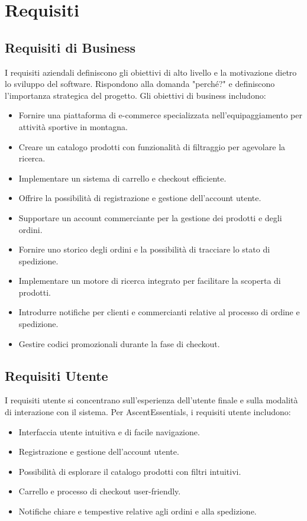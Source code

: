 
\chapter{Requisiti}

\section{Requisiti di Business}
I requisiti aziendali definiscono gli obiettivi di alto livello e la motivazione dietro lo sviluppo del software. Rispondono alla domanda "perché?" e definiscono l'importanza strategica del progetto.
Gli obiettivi di business includono:
\begin{itemize}
    \item Fornire una piattaforma di e-commerce specializzata nell'equipaggiamento per attività sportive in montagna.
    \item Creare un catalogo prodotti con funzionalità di filtraggio per agevolare la ricerca.
    \item Implementare un sistema di carrello e checkout efficiente.
    \item Offrire la possibilità di registrazione e gestione dell'account utente.
    \item Supportare un account commerciante per la gestione dei prodotti e degli ordini.
    \item Fornire uno storico degli ordini e la possibilità di tracciare lo stato di spedizione.
    \item Implementare un motore di ricerca integrato per facilitare la scoperta di prodotti.
    \item Introdurre notifiche per clienti e commercianti relative al processo di ordine e spedizione.
    \item Gestire codici promozionali durante la fase di checkout.
\end{itemize}

\section{Requisiti Utente}
I requisiti utente si concentrano sull'esperienza dell'utente finale e sulla modalità di interazione con il sistema. Per AscentEssentials, i requisiti utente includono:
\begin{itemize}
    \item Interfaccia utente intuitiva e di facile navigazione.
    \item Registrazione e gestione dell'account utente.
    \item Possibilità di esplorare il catalogo prodotti con filtri intuitivi.
    \item Carrello e processo di checkout user-friendly.
    \item Notifiche chiare e tempestive relative agli ordini e alla spedizione.
\end{itemize}